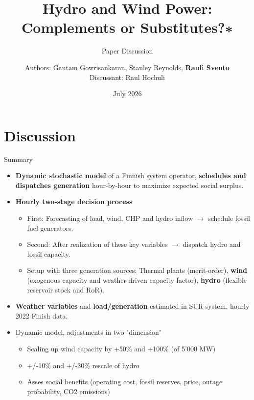 \documentclass[10pt, aspectratio=169]{beamer}
\title[]{Hydro and Wind Power: Complements or Substitutes?∗}
\subtitle{Paper Discussion}
\author{Authors: Gautam Gowrisankaran, Stanley Reynolds, \textbf{Rauli Svento}
\\Discussant: Raul Hochuli}
\institute{WCERE - Portugal}
\date{July 2026}
\begin{document}

\begin{frame}
  \maketitle
\end{frame}


\section{Discussion}

\begin{frame}{Summary}
\begin{itemize}
\item \textbf{Dynamic stochastic model} of a Finnish system operator, \textbf{schedules and dispatches generation} hour-by-hour to maximize expected social surplus.
\item \textbf{Hourly two-stage decision process}
\begin{itemize}
    \item First: Forecasting of load, wind, CHP and hydro inflow $\rightarrow$ schedule fossil fuel generators.
    \item Second: After realization of these key variables $\rightarrow$ dispatch hydro and fossil capacity.
    \item Setup with three generation sources: Thermal plants (merit-order), \textbf{wind} (exogenous capacity and weather-driven capacity factor), \textbf{hydro} (flexible reservoir stock and RoR). 
\end{itemize}
\item \textbf{Weather variables} and \textbf{load/generation} estimated in SUR system, hourly 2022 Finish data.
\item Dynamic model, adjustments in two "dimension"
\begin{itemize}
    \item Scaling up wind capacity by +50\% and +100\% (of 5'000 MW)
    \item +/-10\% and +/-30\% rescale of hydro 
    \item Asses social benefits (operating cost, fossil reserves, price, outage probability, CO2 emissions)
\end{itemize}
\end{itemize}
\end{frame}
\end{document}
